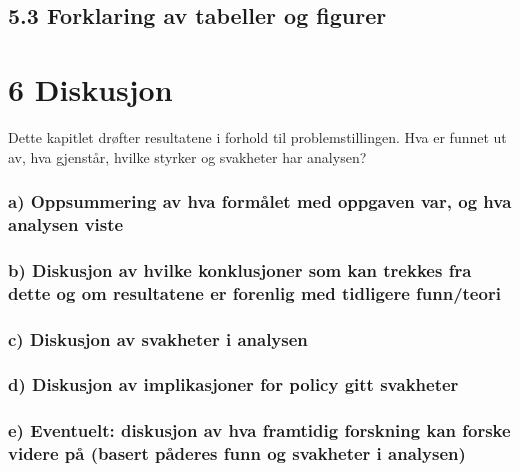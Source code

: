 \documentclass[
  12pt,
  a4paper,
  DIV=11,
  numbers=noendperiod]{scrartcl}
\begin{document}
\subsection{5.3 Forklaring av tabeller og
figurer}\label{forklaring-av-tabeller-og-figurer}

\newpage

\section{6 Diskusjon}\label{diskusjon}

Dette kapitlet drøfter resultatene i forhold til problemstillingen. Hva
er funnet ut av, hva gjenstår, hvilke styrker og svakheter har analysen?

\subsubsection{a) Oppsummering av hva formålet med oppgaven var, og hva
analysen
viste}\label{a-oppsummering-av-hva-formuxe5let-med-oppgaven-var-og-hva-analysen-viste}

\subsubsection{b) Diskusjon av hvilke konklusjoner som kan trekkes fra
dette og om resultatene er forenlig med tidligere
funn/teori}\label{b-diskusjon-av-hvilke-konklusjoner-som-kan-trekkes-fra-dette-og-om-resultatene-er-forenlig-med-tidligere-funnteori}

\subsubsection{c) Diskusjon av svakheter i
analysen}\label{c-diskusjon-av-svakheter-i-analysen}

\subsubsection{d) Diskusjon av implikasjoner for policy gitt
svakheter}\label{d-diskusjon-av-implikasjoner-for-policy-gitt-svakheter}

\subsubsection{e) Eventuelt: diskusjon av hva framtidig forskning kan
forske videre på (basert påderes funn og svakheter i
analysen)}\label{e-eventuelt-diskusjon-av-hva-framtidig-forskning-kan-forske-videre-puxe5-basert-puxe5deres-funn-og-svakheter-i-analysen}
\end{document}
